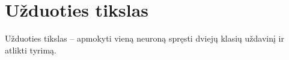 \section{Užduoties tikslas}

Užduoties tikslas – apmokyti vieną neuroną spręsti dviejų klasių uždavinį ir atlikti tyrimą.